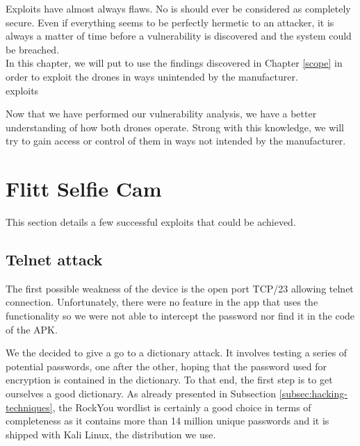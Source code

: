 \begin{chaptercover}{Exploits}%
{
{\large \hyphenation{}  have almost always flaws. No \acrshort{is} should ever be considered as completely secure. Even if everything seems to be perfectly hermetic to an attacker, it is always a matter of time before a vulnerability is discovered and the system could be breached. \newline \\ In this chapter, we will put to use the findings discovered in Chapter \ref{scope} in order to exploit the drones in ways unintended by the manufacturer. \newline\\}}%
{exploits}

Now that we have performed our vulnerability analysis, we have a better understanding of how both drones operate. Strong with this knowledge, we will try to gain access or control of them in ways not intended by the manufacturer.


\section{Flitt Selfie Cam}

This section details a few successful exploits that could be achieved.

\subsection{Telnet attack}

The first possible weakness of the device is the open port TCP/23 allowing telnet connection. Unfortunately, there were no feature in the app that uses the functionality so we were not able to intercept the password nor find it in the code of the APK.

We the decided to give a go to a dictionary attack. It involves testing a series of potential passwords, one after the other, hoping that the password used for encryption is contained in the dictionary. To that end, the first step is to get ourselves a good dictionary. As already presented in Subsection \ref{subsec:hacking-techniques}, the RockYou wordlist is certainly a good choice in terms of completeness as it contains more than 14 million unique passwords and it is shipped with Kali Linux, the distribution we use.


\end{chaptercover}
